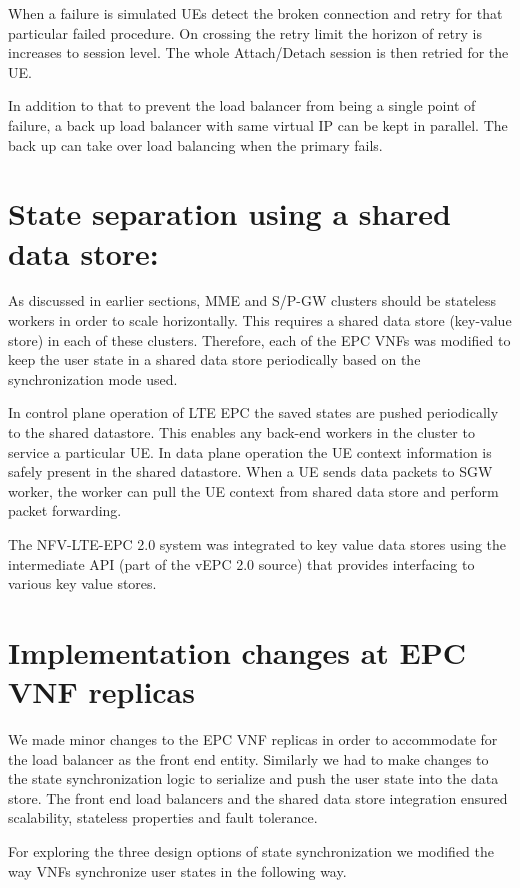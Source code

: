 \documentclass[hidelinks]{report}
\begin{document}
When a failure is simulated UEs detect the broken connection and retry for that particular failed procedure. On crossing the retry limit the horizon of retry is increases to session level. The whole Attach/Detach session is then retried for the UE. 

In addition to that to prevent the load balancer from being a single point of failure, a back up load balancer with same virtual IP can be kept in parallel. The back up can take over load balancing when the primary fails.
\section*{State separation using a shared data store:}

As discussed in earlier sections, MME and S/P-GW clusters should be stateless workers in order to scale horizontally. This requires a shared data store (key-value store) in each of these clusters. Therefore, each of the EPC VNFs was modified to keep the user state in a shared data store periodically based on the synchronization mode used.

\par In control plane operation of LTE EPC the saved states are pushed periodically to the shared datastore. This enables any back-end workers in the cluster to service a particular UE. In data plane operation the UE context information is safely present in the shared datastore. When a UE sends data packets to SGW worker, the worker can pull the UE context from shared data store and perform packet forwarding.

\par The NFV-LTE-EPC 2.0 system was integrated to key value data stores using the  intermediate API (part of the vEPC 2.0 source) that provides interfacing to various key value stores.

\section*{Implementation changes at EPC VNF replicas}

We made minor changes to the EPC VNF replicas in order to accommodate for the load balancer as the front end entity. Similarly we had to make changes to the state synchronization logic to serialize and push the user state into the data store. The front end load balancers and the shared data store integration ensured scalability, stateless properties and fault tolerance. 

\par For exploring the three design options of state synchronization we modified the way VNFs synchronize user states in the following way. 
\end{document}

